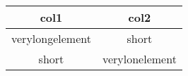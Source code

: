 \documentclass[12pt, a4paper] {article}
\begin{document}
\begin{center}
\begin{tabular}{|| c  c ||}

 \hline
 col1 & col2 \\
 \hline\hline
 verylongelement & short  \\
 \hline
 short & verylonelement  \\
 \hline


\end{tabular}
\end{center}
\end{document}

